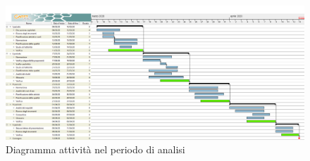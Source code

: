 \documentclass[../piano-di-progetto.tex]{subfiles}
\begin{document}
    \newpage
    \begin{landscape}
        \begin{figure}[H]
            \centering
            \includegraphics[width=24cm]{img/analisi.png}
            \caption{Diagramma attività nel periodo di analisi}
          \end{figure}
    \end{landscape}
\end{document}
